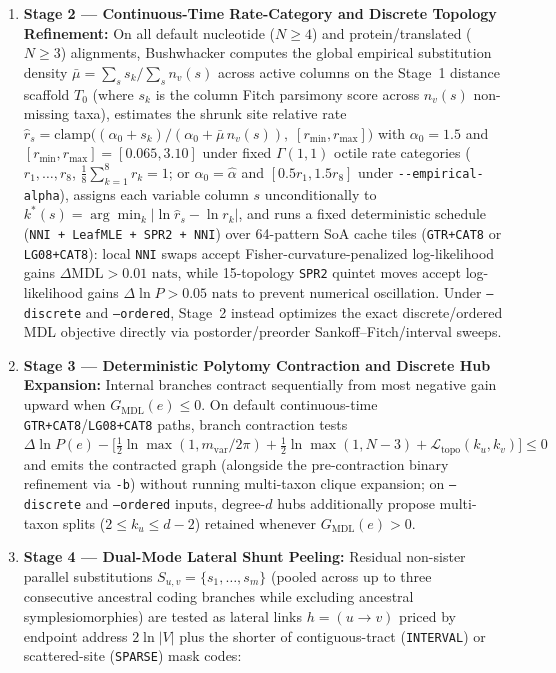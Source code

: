 \documentclass[12pt]{article}
\begin{document}
\begin{enumerate}
    \item \textbf{Stage 2 --- Continuous-Time Rate-Category and Discrete Topology Refinement:} On all default nucleotide ($N \ge 4$) and protein/translated ($N \ge 3$) alignments, Bushwhacker computes the global empirical substitution density $\bar{\mu} = \sum_s s_k / \sum_s n_v(s)$ across active columns on the Stage~1 distance scaffold $T_0$ (where $s_k$ is the column Fitch parsimony score across $n_v(s)$ non-missing taxa), estimates the shrunk site relative rate $\hat{r}_s = \mathrm{clamp}\!\big((\alpha_0 + s_k)/(\alpha_0 + \bar{\mu}\,n_v(s)),\; [r_{\min}, r_{\max}]\big)$ with $\alpha_0 = 1.5$ and $[r_{\min},r_{\max}] = [0.065, 3.10]$ under fixed $\Gamma(1,1)$ octile rate categories ($r_1, \dots, r_8$, $\frac{1}{8}\sum_{k=1}^8 r_k = 1$; or $\alpha_0 = \hat{\alpha}$ and $[0.5 r_1, 1.5 r_8]$ under \texttt{{-}{-}empirical-alpha}), assigns each variable column $s$ unconditionally to $k^*(s) = \arg\min_k |\ln \hat{r}_s - \ln r_k|$, and runs a fixed deterministic schedule (\texttt{NNI + LeafMLE + SPR2 + NNI}) over 64-pattern SoA cache tiles (\texttt{GTR+CAT8} or \texttt{LG08+CAT8}): local \texttt{NNI} swaps accept Fisher-curvature-penalized log-likelihood gains $\Delta\text{MDL} > 0.01\text{ nats}$, while 15-topology \texttt{SPR2} quintet moves accept log-likelihood gains $\Delta\ln P > 0.05\text{ nats}$ to prevent numerical oscillation. Under \texttt{--discrete} and \texttt{--ordered}, Stage~2 instead optimizes the exact discrete/ordered MDL objective directly via postorder/preorder Sankoff--Fitch/interval sweeps.
    \item \textbf{Stage 3 --- Deterministic Polytomy Contraction and Discrete Hub Expansion:} Internal branches contract sequentially from most negative gain upward when $G_{\text{MDL}}(e) \le 0$. On default continuous-time \texttt{GTR+CAT8}/\texttt{LG08+CAT8} paths, branch contraction tests $\Delta\ln P(e) - \big[\frac{1}{2}\ln\max(1, m_{\text{var}}/2\pi) + \frac{1}{2}\ln\max(1, N-3) + \mathcal{L}_{\text{topo}}(k_u, k_v)\big] \le 0$ and emits the contracted graph (alongside the pre-contraction binary refinement via \texttt{-b}) without running multi-taxon clique expansion; on \texttt{--discrete} and \texttt{--ordered} inputs, degree-$d$ hubs additionally propose multi-taxon splits ($2 \le k_u \le d-2$) retained whenever $G_{\text{MDL}}(e) > 0$.
    \item \textbf{Stage 4 --- Dual-Mode Lateral Shunt Peeling:} Residual non-sister parallel substitutions $S_{u,v} = \{s_1, \dots, s_m\}$ (pooled across up to three consecutive ancestral coding branches while excluding ancestral symplesiomorphies) are tested as lateral links $h = (u \to v)$ priced by endpoint address $2\ln|V|$ plus the shorter of contiguous-tract (\texttt{INTERVAL}) or scattered-site (\texttt{SPARSE}) mask codes:

\end{enumerate}
\end{document}

